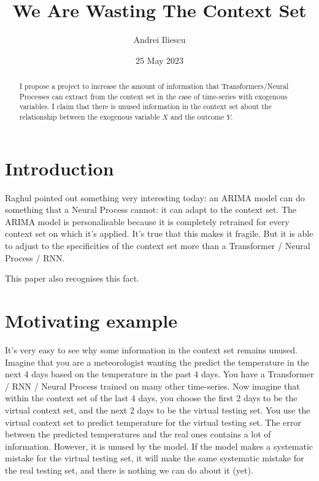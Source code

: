 \documentclass[a4paper]{article}
\title{We Are Wasting The Context Set}
\author{Andrei Iliescu}
\date{25 May 2023}
\begin{document}
\maketitle

\begin{abstract}
    I propose a project to increase the amount of information that Transformers/Neural Processes can extract from the context set in the case of time-series with exogenous variables. I claim that there is unused information in the context set about the relationship between the exogenous variable $X$ and the outcome $Y$.
\end{abstract}

\section{Introduction}

Raghul pointed out something very interesting today: an ARIMA model can do something that a Neural Process cannot: it can adapt to the context set. The ARIMA model is personalisable because it is completely retrained for every context set on which it's applied. It's true that this makes it fragile. But it is able to adjust to the specificities of the context set more than a Transformer / Neural Process / RNN.

This paper also recognises this fact. 

\section{Motivating example}

It's very easy to see why some information in the context set remains unused. Imagine that you are a meteorologist wanting the predict the temperature in the next 4 days based on the temperature in the past 4 days. You have a Transformer / RNN / Neural Process trained on many other time-series. Now imagine that within the context set of the last 4 days, you choose the first 2 days to be the virtual context set, and the next 2 days to be the virtual testing set. You use the virtual context set to predict temperature for the virtual testing set. The error between the predicted temperatures and the real ones contains a lot of information. However, it is unused by the model. If the model makes a systematic mistake for the virtual testing set, it will make the same systematic mistake for the real testing set, and there is nothing we can do about it (yet).
\end{document}
